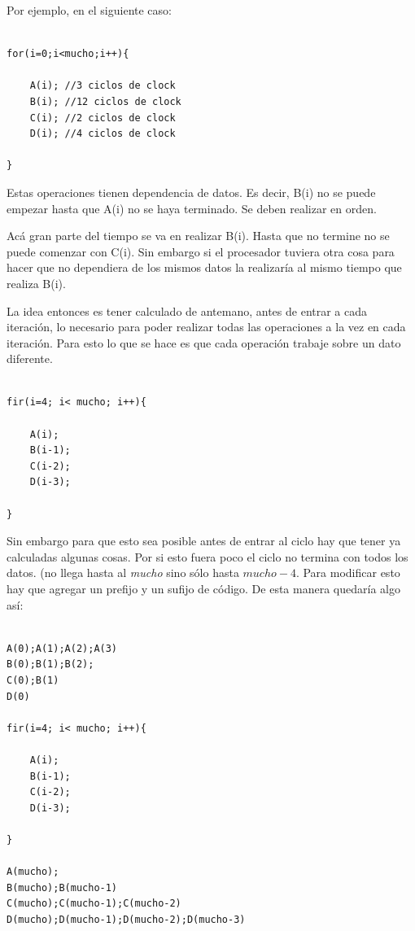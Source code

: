 	Por ejemplo, en el siguiente caso:

\lstset{language=C}

\begin{lstlisting}[frame=single]  % Start your code-block

for(i=0;i<mucho;i++){

	A(i); //3 ciclos de clock
	B(i); //12 ciclos de clock
	C(i); //2 ciclos de clock
	D(i); //4 ciclos de clock

}
\end{lstlisting}

	Estas operaciones tienen dependencia de datos. Es decir, B(i) no se puede empezar hasta
que A(i) no se haya terminado. Se deben realizar en orden.

	Acá gran parte del tiempo se va en realizar B(i). Hasta que no termine no se puede comenzar
con C(i). Sin embargo si el procesador tuviera otra cosa para hacer que no dependiera de los mismos
datos la realizaría al mismo tiempo que realiza B(i).

	La idea entonces es tener calculado de antemano, antes de entrar a cada iteración, lo necesario
para poder realizar todas las operaciones a la vez en cada iteración. Para esto lo que se hace 
es que cada operación trabaje sobre un dato diferente.

\begin{lstlisting}[frame=single]

fir(i=4; i< mucho; i++){

	A(i);
	B(i-1);
	C(i-2);
	D(i-3);

}

\end{lstlisting}

	Sin embargo para que esto sea posible antes de entrar al ciclo hay que tener ya
calculadas algunas cosas. Por si esto fuera poco el ciclo no termina con todos los datos.
(no llega hasta al \textit{mucho} sino sólo hasta $mucho-4$. Para modificar
esto hay que agregar un prefijo y un sufijo de código. De esta manera quedaría algo
así:

\newpage

\begin{lstlisting}[frame=single]

A(0);A(1);A(2);A(3)
B(0);B(1);B(2);
C(0);B(1)
D(0)

fir(i=4; i< mucho; i++){

	A(i);
	B(i-1);
	C(i-2);
	D(i-3);

}

A(mucho);
B(mucho);B(mucho-1)
C(mucho);C(mucho-1);C(mucho-2)
D(mucho);D(mucho-1);D(mucho-2);D(mucho-3)


\end{lstlisting}

